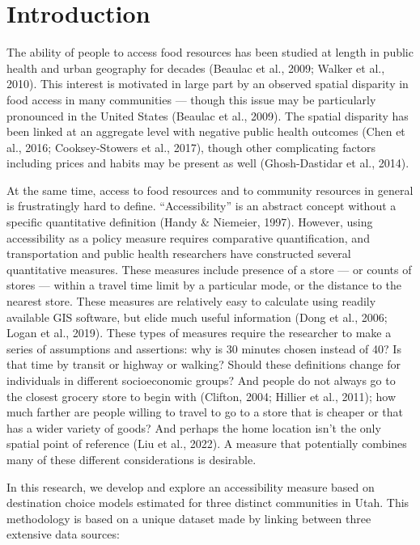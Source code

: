 \documentclass[
  letterpaper,
  number,
  review,
  3p]{elsarticle}
\begin{document}

\section{Introduction}\label{introduction}

The ability of people to access food resources has been studied at
length in public health and urban geography for decades (Beaulac et al.,
2009; Walker et al., 2010). This interest is motivated in large part by
an observed spatial disparity in food access in many communities ---
though this issue may be particularly pronounced in the United States
(Beaulac et al., 2009). The spatial disparity has been linked at an
aggregate level with negative public health outcomes (Chen et al., 2016;
Cooksey-Stowers et al., 2017), though other complicating factors
including prices and habits may be present as well (Ghosh-Dastidar et
al., 2014).

At the same time, access to food resources and to community resources in
general is frustratingly hard to define. ``Accessibility'' is an
abstract concept without a specific quantitative definition (Handy \&
Niemeier, 1997). However, using accessibility as a policy measure
requires comparative quantification, and transportation and public
health researchers have constructed several quantitative measures. These
measures include presence of a store --- or counts of stores --- within
a travel time limit by a particular mode, or the distance to the nearest
store. These measures are relatively easy to calculate using readily
available GIS software, but elide much useful information (Dong et al.,
2006; Logan et al., 2019). These types of measures require the
researcher to make a series of assumptions and assertions: why is 30
minutes chosen instead of 40? Is that time by transit or highway or
walking? Should these definitions change for individuals in different
socioeconomic groups? And people do not always go to the closest grocery
store to begin with (Clifton, 2004; Hillier et al., 2011); how much
farther are people willing to travel to go to a store that is cheaper or
that has a wider variety of goods? And perhaps the home location isn't
the only spatial point of reference (Liu et al., 2022). A measure that
potentially combines many of these different considerations is
desirable.

In this research, we develop and explore an accessibility measure based
on destination choice models estimated for three distinct communities in
Utah. This methodology is based on a unique dataset made by linking
between three extensive data sources:
\end{document}
